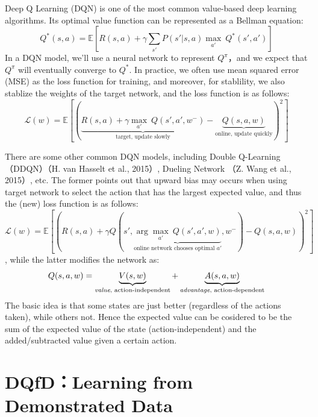 \documentclass[a0,portrait]{a0poster}
\begin{document}
\begin{multicols}{2}
Deep Q Learning (DQN) is one of the most common value-based deep learning algorithms. Its optimal value function can be represented as a Bellman equation:
\[Q^*(s,a) = \mathbb{E}\left[R(s,a) + \gamma \sum_{s'}P(s'|s,a) \underset{a'}\max\ Q^*(s',a')\right]\]
In a DQN model, we'll use a neural network to represent $Q^\pi$，and we expect that $Q^\pi$ will eventually converge to $Q^*$. In practice, we often use mean squared error (MSE) as the loss function for training, and moreover, for stablility, we also stablize the weights of the target network, and the loss function is as follows:
\[\mathcal{L}(w) = \mathbb{E}\left[\left(\underbrace{R(s,a) + \gamma \underset{a'}\max\ Q(s',a', w^-)}_{\text{target, update slowly}} - \underbrace{Q(s,a,w)}_{\text{online, update quickly}}\right)^2\right]\]
\par
There are some other common DQN models, including Double Q-Learning（DDQN）（H. van Hasselt et al., 2015）\cite{DBLP:journals/corr/HasseltGS15}, Dueling Network （Z. Wang et al., 2015）\cite{DBLP:journals/corr/WangFL15}, etc. The former points out that upward bias may occurs when using target network to select the action that has the largest expected value, and thus the (new) loss function is as follows:
\[\mathcal{L}(w) = \mathbb{E}\left[\left(R(s,a) + \gamma Q(s',\underbrace{\arg \underset{a'}\max\ Q(s',a',w)}_{\text{online network chooses optimal } a'}, w^-) - Q(s,a,w)\right)^2\right]\], while the latter modifies the network as:
\[Q(s,a,w) = \underbrace{V(s,w)}_{\text{\emph{value}, action-independent}} + \underbrace{A(s,a,w)}_{\text{\emph{advantage}, action-dependent}}\]
The basic idea is that some states are just better (regardless of the actions taken), while others not. Hence the expected value can be cosidered to be the sum of the expected value of the state (action-independent) and the added/subtracted value given a certain action.




\section*{DQfD：Learning from Demonstrated Data}


\end{multicols}
\end{document}
